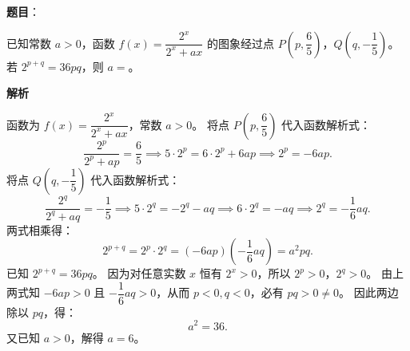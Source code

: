 \begin{answer}

\textbf{题目}：

已知常数 $a > 0$，函数 $f(x) = \dfrac{2^x}{2^x + ax}$ 的图象经过点 $P\left(p, \dfrac{6}{5}\right)$，$Q\left(q, -\dfrac{1}{5}\right)$。若 $2^{p+q} = 36pq$，则 $a =$\gkblank{}。

\textbf{解析}

函数为 $f(x) = \dfrac{2^x}{2^x + ax}$，常数 $a > 0$。
将点 $P\left(p, \dfrac{6}{5}\right)$ 代入函数解析式：
\nopagebreak[4]
\[\frac{2^p}{2^p + ap} = \frac{6}{5} \implies 5 \cdot 2^p = 6 \cdot 2^p + 6ap \implies 2^p = -6ap.\]
将点 $Q\left(q, -\dfrac{1}{5}\right)$ 代入函数解析式：
\nopagebreak[4]
\[\frac{2^q}{2^q + aq} = -\frac{1}{5} \implies 5 \cdot 2^q = -2^q - aq \implies 6 \cdot 2^q = -aq \implies 2^q = -\frac{1}{6}aq.\]
两式相乘得：
\nopagebreak[4]
\[2^{p+q} = 2^p \cdot 2^q = (-6ap) \left(-\frac{1}{6}aq\right) = a^2 pq.\]
已知 $2^{p+q} = 36pq$。
因为对任意实数 $x$ 恒有 $2^x > 0$，所以 $2^p > 0$，$2^q > 0$。
由上两式知 $-6ap > 0$ 且 $-\dfrac{1}{6}aq > 0$，从而 $p < 0, q < 0$，必有 $pq > 0 \ne 0$。
因此两边除以 $pq$，得：
\nopagebreak[4]
\[a^2 = 36.\]
又已知 $a > 0$，解得 $a = 6$。


\end{answer}
